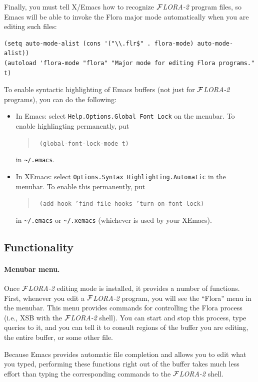 \documentclass[11pt]{article}
\newcommand{\FLORA}{{\mbox{${\cal F}${\small\it LORA}\rm\emph{-2}}}\xspace}
\begin{document}
Finally, you must tell X/Emacs how to recognize \FLORA program files, so
Emacs will be able to invoke the Flora major mode automatically when you
are editing such files:
\begin{verbatim}
(setq auto-mode-alist (cons '("\\.flr$" . flora-mode) auto-mode-alist))
(autoload 'flora-mode "flora" "Major mode for editing Flora programs." t)
\end{verbatim}

To enable syntactic highlighting of Emacs buffers (not just for \FLORA
programs), you can do the following:
\begin{itemize}
  \item  {\sf In Emacs:} select {\tt Help.Options.Global Font Lock} on
    the menubar.  To enable highlingting permanently, put 
    \begin{quote}
      \tt
      (global-font-lock-mode t)
    \end{quote}
    in \verb|~/.emacs|.
  \item {\sf In XEmacs:} select {\tt Options.Syntax
        Highlighting.Automatic} in the menubar. To enable this permanently, put
      \begin{quote}
        \tt
        (add-hook 'find-file-hooks 'turn-on-font-lock)
      \end{quote}
      in \verb|~/.emacs| or \verb|~/.xemacs| (whichever is used by your
      XEmacs).
\end{itemize}


\subsection{Functionality}


\paragraph{Menubar menu.}
Once \FLORA editing mode is installed, it provides a number of functions.
First, whenever you edit a \FLORA program, you will see the ``Flora'' menu
in the menubar. This menu provides commands for controlling the Flora
process (i.e., XSB with the \FLORA shell). You can start and stop
this process, type queries to it, and you can tell it to consult regions of
the buffer you are editing, the entire buffer, or some other file.

Because Emacs provides automatic file completion and allows you to edit
what you typed, performing these functions right out of the buffer takes
much less effort than typing the corresponding commands to the \FLORA
shell.
\end{document}
